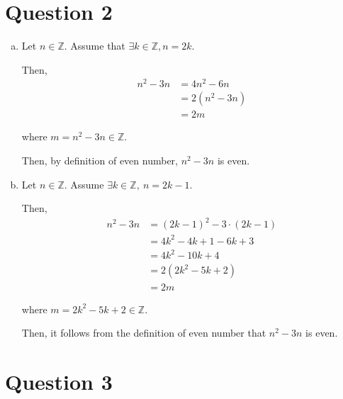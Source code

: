 \documentclass[12pt]{article}
\begin{document}
\section*{Question 2}
\begin{enumerate}[a.]
    \item

    Let $n \in \mathbb{Z}$. Assume that $\exists k \in \mathbb{Z}, n = 2k$.

    \bigskip

    Then,
    \setcounter{equation}{0}
    \begin{align}
        n^2 - 3n &= 4n^2 - 6n\\
        &= 2(n^2 - 3n)\\
        &= 2m
    \end{align}

    where $m = n^2 - 3n \in \mathbb{Z}$.

    \bigskip

    Then, by definition of even number, $n^2 - 3n$ is even.

    \item

    Let $n \in \mathbb{Z}$. Assume $\exists k \in \mathbb{Z},\:n = 2k - 1$.

    \bigskip

    Then,
    \setcounter{equation}{0}
    \begin{align}
        n^2 - 3n &= (2k - 1)^2 - 3 \cdot (2k - 1)\\
        &= 4k^2 - 4k + 1 -6k +3\\
        &= 4k^2 - 10k + 4\\
        &= 2(2k^2 - 5k + 2)\\
        &= 2m
    \end{align}

    where $m = 2k^2 - 5k + 2 \in \mathbb{Z}$.

    \bigskip

    Then, it follows from the definition of even number that $n^2-3n$ is even.
\end{enumerate}

\section*{Question 3}
\end{document}
